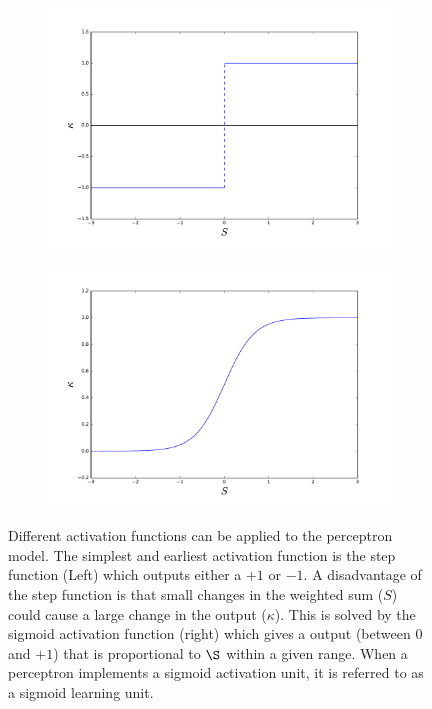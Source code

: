 \begin{figure}[!h]
  \centering
  \begin{subfigure}{.49\textwidth}
        \centering
        \includegraphics[width=\linewidth]{figures/stepfunction.pdf}
    \end{subfigure} %
    \begin{subfigure}{0.49\textwidth}
        \centering
        \includegraphics[width=\linewidth]{figures/logisticfunction.pdf}
    \end{subfigure}
  \caption{Different activation functions can be applied to the perceptron model. The simplest and earliest activation function is the step function (Left) which outputs either a $+1$ or $-1$. A disadvantage of the step function is that small changes in the weighted sum ($S$) could cause a large change in the output ($\kappa$). This is solved by the sigmoid activation function (right) which gives a output (between $0$ and $+1$) that is proportional to $\S$ within a given range. When a perceptron implements a sigmoid activation unit, it is referred to as a sigmoid learning unit.}
  \label{fig:activation_functions}
\end{figure}



